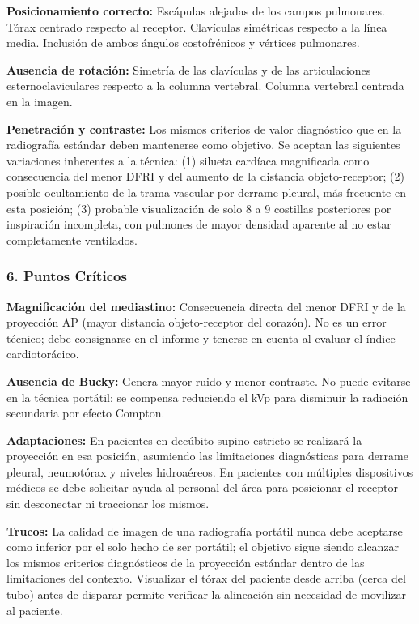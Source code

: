 \textbf{Posicionamiento correcto:} Escápulas alejadas de los campos pulmonares. Tórax centrado respecto al receptor. Clavículas simétricas respecto a la línea media. Inclusión de ambos ángulos costofrénicos y vértices pulmonares.

\textbf{Ausencia de rotación:} Simetría de las clavículas y de las articulaciones esternoclaviculares respecto a la columna vertebral. Columna vertebral centrada en la imagen.

\textbf{Penetración y contraste:} Los mismos criterios de valor diagnóstico que en la radiografía estándar deben mantenerse como objetivo. Se aceptan las siguientes variaciones inherentes a la técnica: (1) silueta cardíaca magnificada como consecuencia del menor DFRI y del aumento de la distancia objeto-receptor; (2) posible ocultamiento de la trama vascular por derrame pleural, más frecuente en esta posición; (3) probable visualización de solo 8 a 9 costillas posteriores por inspiración incompleta, con pulmones de mayor densidad aparente al no estar completamente ventilados.

\subsubsection*{6. Puntos Críticos}

\textbf{Magnificación del mediastino:} Consecuencia directa del menor DFRI y de la proyección AP (mayor distancia objeto-receptor del corazón). No es un error técnico; debe consignarse en el informe y tenerse en cuenta al evaluar el índice cardiotorácico.

\textbf{Ausencia de Bucky:} Genera mayor ruido y menor contraste. No puede evitarse en la técnica portátil; se compensa reduciendo el kVp para disminuir la radiación secundaria por efecto Compton.

\textbf{Adaptaciones:} En pacientes en decúbito supino estricto se realizará la proyección en esa posición, asumiendo las limitaciones diagnósticas para derrame pleural, neumotórax y niveles hidroaéreos. En pacientes con múltiples dispositivos médicos se debe solicitar ayuda al personal del área para posicionar el receptor sin desconectar ni traccionar los mismos.

\textbf{Trucos:} La calidad de imagen de una radiografía portátil nunca debe aceptarse como inferior por el solo hecho de ser portátil; el objetivo sigue siendo alcanzar los mismos criterios diagnósticos de la proyección estándar dentro de las limitaciones del contexto. Visualizar el tórax del paciente desde arriba (cerca del tubo) antes de disparar permite verificar la alineación sin necesidad de movilizar al paciente.

